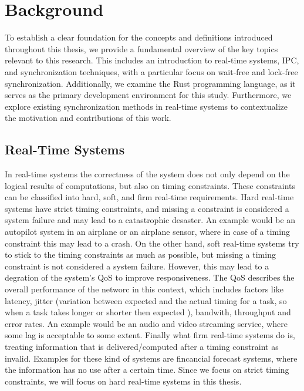 \chapter{Background}

To establish a clear foundation for the concepts and definitions introduced throughout this thesis, we provide a fundamental overview of the key topics relevant to this research. This includes an introduction to real-time systems, \acf{IPC}, and synchronization techniques, with a particular focus on wait-free and lock-free synchronization. Additionally, we examine the Rust programming language, as it serves as the primary development environment for this study. Furthermore, we explore existing synchronization methods in real-time systems to contextualize the motivation and contributions of this work.

\section{Real-Time Systems}

In real-time systems the correctness of the system does not only depend on the logical results of computations, but also on timing constraints. These constraints can be classified into hard, soft, and firm real-time requirements. Hard real-time systems have strict timing constraints, and missing a constraint is considered a system failure and may lead to a catastrophic desaster. An example would be an autopilot system in an airplane or an airplane sensor, where in case of a timing constraint this may lead to a crash. On the other hand, soft real-time systems try to stick to the timing constraints as much as possible, but missing a timing constraint is not considered a system failure. However, this may lead to a degration of the system's \ac{QoS} to improve responsiveness. The \ac{QoS} describes the overall performance of the networc in this context, which includes factors like latency, jitter (variation between expected and the actual timing for a task, so when a task takes longer or shorter then expected \cite{jitter}), bandwith, throughput and error rates. An example would be an audio and video streaming service, where some lag is acceptable to some extent. Finally what firm real-time systems do is, treating information that is delivered/computed after a timing constraint as invalid. Examples for these kind of systems are fincancial forecast systems, where the information has no use after a certain time. Since we focus on strict timing constraints, we will focus on hard real-time systems in this thesis. \cite{real-time}

